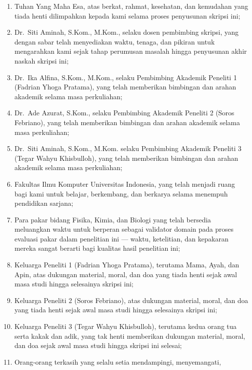 \documentclass[../../thesis]{subfiles}
\begin{document}
\begin{enumerate}
  \item Tuhan Yang Maha Esa, atas berkat, rahmat, kesehatan, dan kemudahan
        yang tiada henti dilimpahkan kepada kami selama proses penyusunan
        skripsi ini;
  \item Dr.\ Siti Aminah, S.Kom., M.Kom., selaku dosen pembimbing skripsi,
        yang dengan sabar telah menyediakan waktu, tenaga, dan pikiran untuk
        mengarahkan kami sejak tahap perumusan masalah hingga penyusunan
        akhir naskah skripsi ini;
  \item Dr.\ Ika Alfina, S.Kom., M.Kom.,
        selaku Pembimbing Akademik Peneliti 1 (Fadrian Yhoga Pratama), yang
        telah memberikan bimbingan dan arahan akademik selama masa perkuliahan;
  \item Dr.\ Ade Azurat, S.Kom., selaku Pembimbing Akademik Peneliti 2
        (Soros Febriano), yang telah memberikan bimbingan dan arahan akademik
        selama masa perkuliahan;
  \item Dr.\ Siti Aminah, S.Kom., M.Kom. selaku Pembimbing Akademik Peneliti 3
        (Tegar Wahyu Khisbulloh), yang telah memberikan bimbingan dan arahan akademik
        selama masa perkuliahan;
  \item Fakultas Ilmu Komputer Universitas Indonesia, yang telah menjadi
        ruang bagi kami untuk belajar, berkembang, dan berkarya selama
        menempuh pendidikan sarjana;
  \item Para pakar bidang Fisika, Kimia, dan Biologi yang telah bersedia
        meluangkan waktu untuk berperan sebagai validator domain pada
        proses evaluasi pakar dalam penelitian ini --- waktu, ketelitian,
        dan kepakaran mereka sangat berarti bagi kualitas hasil penelitian
        ini;
  \item Keluarga Peneliti 1 (Fadrian Yhoga Pratama), terutama Mama, Ayah,
        dan Apin, atas dukungan material, moral, dan doa yang tiada henti
        sejak awal masa studi hingga selesainya skripsi ini;
  \item Keluarga Peneliti 2 (Soros Febriano), atas dukungan material,
        moral, dan doa yang tiada henti sejak awal masa studi hingga
        selesainya skripsi ini;
  \item Keluarga Peneliti 3 (Tegar Wahyu Khisbulloh), terutama kedua orang
        tua serta kakak dan adik, yang tak henti memberikan dukungan material,
        moral, dan doa sejak awal masa studi hingga skripsi ini selesai;
  \item Orang-orang terkasih yang selalu setia mendampingi, menyemangati,

\end{enumerate}
\end{document}
